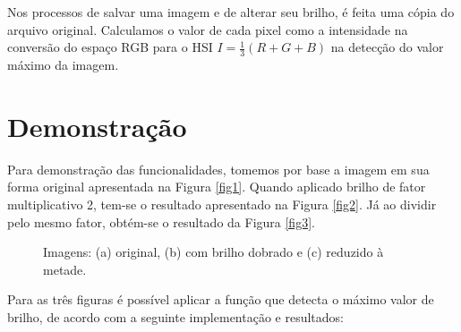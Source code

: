 \documentclass[a4paper, 10pt, conference]{ieeeconf}
\begin{document}
Nos processos de salvar uma imagem e de alterar seu brilho, é feita uma cópia do arquivo original. Calculamos o valor de cada pixel como a intensidade na conversão do espaço RGB para o HSI $I=\frac{1}{3}(R+G+B)$ \cite{rgb} na detecção do valor máximo da imagem.

\section{Demonstração}


Para demonstração das funcionalidades, tomemos por base a imagem em sua forma original apresentada na Figura \ref{fig1}. Quando aplicado brilho de fator multiplicativo 2, tem-se o resultado apresentado na Figura \ref{fig2}. Já ao dividir pelo mesmo fator, obtém-se o resultado da Figura \ref{fig3}.

\begin{figure}[h]
	\centering
	\hspace{0.05cm}
	\hspace{0.05cm}
	\caption{Imagens: (a) original, (b) com brilho dobrado e (c) reduzido à metade.}
	\label{comp}
\end{figure}

Para as três figuras é possível aplicar a função que detecta o máximo valor de brilho, de acordo com a seguinte implementação e resultados:
\end{document}
